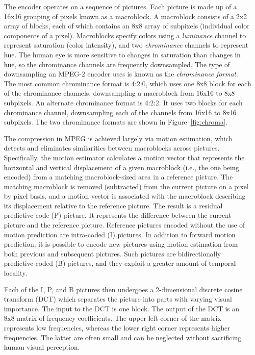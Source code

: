 The encoder operates on a sequence of pictures. Each picture is made
up of a 16x16 grouping of pixels known as a macroblock.  A
macroblock consists of a 2x2 array of blocks, each of which contains
an 8x8 array of subpixels (individual color components of a pixel). 
Macroblocks specify colors using a {\it
luminance} channel to represent saturation (color intensity), and two
{\it chrominance} channels to represent hue.  The human eye is more
sensitive to changes in saturation than changes in hue, so the
chrominance channels are frequently downsampled. The type of
downsampling an MPEG-2 encoder uses is known as the {\it chrominance
format}. The most common chrominance format is 4:2:0, which uses one
8x8 block for each of the chrominance channels, downsampling a
macroblock from 16x16 to 8x8 subpixels. An alternate chrominance format
is 4:2:2. It uses two blocks for each chrominance channel,
downsampling each of the channels from 16x16 to 8x16 subpixels. The two
chrominance formats are shown in Figure~\ref{fig:chroma}.

The compression in MPEG is achieved largely via motion estimation,
which detects and eliminates similarities between macroblocks across
pictures. Specifically, the motion estimator calculates a motion
vector that represents the horizontal and vertical displacement of a
given macroblock (i.e., the one being encoded) from a matching
macroblock-sized area in a reference picture.  The matching macroblock
is removed (subtracted) from the current picture on a pixel by pixel
basis, and a motion vector is associated with the macroblock
describing its displacement relative to the reference picture. The
result is a residual predictive-code (P) picture. It represents the
difference between the current picture and the reference
picture. Reference pictures encoded without the use of motion
prediction are intra-coded (I) pictures. In addition to forward motion
prediction, it is possible to encode new pictures using motion
estimation from both previous and subsequent pictures. Such pictures
are bidirectionally predictive-coded (B) pictures, and they exploit a
greater amount of temporal locality.

Each of the I, P, and B pictures then undergoes a 2-dimensional
discrete cosine transform (DCT) which separates the picture into parts
with varying visual importance. The input to the DCT is one block.
The output of the
DCT is an 8x8 matrix of frequency coefficients. The upper left corner
of the matrix represents low frequencies, whereas the lower right
corner represents higher frequencies. The latter are often small and
can be neglected without sacrificing human visual perception.


